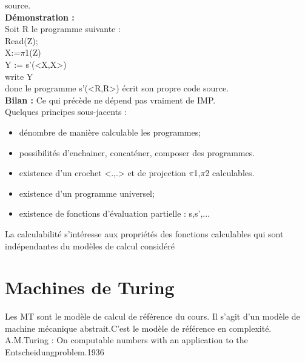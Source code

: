 \documentclass{article}
\begin{document}
source.\\\textbf{Démonstration : }\\Soit R le programme suivante : \\Read(Z);\\X:=$\pi$1(Z)\\Y := s'(<X,X>)\\write Y\\donc le programme s'(<R,R>) écrit son propre code source.\\\textbf{Bilan : }Ce qui précède ne dépend pas vraiment de IMP.\\Quelques principes sous-jacents :\begin{itemize}
\item dénombre de manière calculable les programmes;
\item possibilités d'enchainer, concaténer, composer des programmes.
\item existence d'un crochet <.,.> et de projection $\pi$1,$\pi$2 calculables.
\item existence d'un programme universel;
\item existence de fonctions d'évaluation partielle : s,s',...
\end{itemize}
La calculabilité s'intéresse aux propriétés des fonctions calculables qui sont indépendantes du modèles de calcul considéré
\section{Machines de Turing} Les MT sont le modèle de calcul de référence du cours. Il s'agit d'un modèle de machine mécanique abstrait.C'est le modèle de référence en complexité. A.M.Turing  : On computable numbers with an application to the Entscheidungproblem.1936
\end{document}
